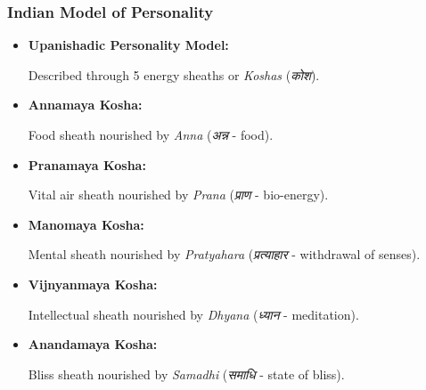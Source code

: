 \begin{frame}[fragile]\frametitle{Indian Model of Personality}

      \begin{itemize}
        \item \textbf{Upanishadic Personality Model:}
        
        Described through 5 energy sheaths or \textit{Koshas} (\textit{कोश}).
        
        \item \textbf{Annamaya Kosha:} 
        
        Food sheath nourished by \textit{Anna} (\textit{अन्न} - food).
        
        \item \textbf{Pranamaya Kosha:}
        
        Vital air sheath nourished by \textit{Prana} (\textit{प्राण} - bio-energy).
        
        \item \textbf{Manomaya Kosha:}
        
        Mental sheath nourished by \textit{Pratyahara} (\textit{प्रत्याहार} - withdrawal of senses).
        
        \item \textbf{Vijnyanmaya Kosha:}
        
        Intellectual sheath nourished by \textit{Dhyana} (\textit{ध्यान} - meditation).
        
        \item \textbf{Anandamaya Kosha:}
        
        Bliss sheath nourished by \textit{Samadhi} (\textit{समाधि} - state of bliss).
        
      \end{itemize}

\end{frame}


